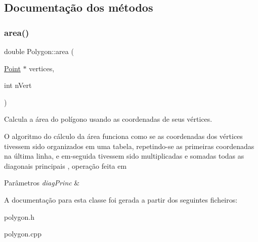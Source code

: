 \subsection{Documentação dos métodos}
\mbox{\label{class_polygon_a1605b702a19992a4631aa1011092c0c1}} 
\subsubsection{\texorpdfstring{area()}{area()}}
{\footnotesize\ttfamily double Polygon\+::area (\begin{DoxyParamCaption}\item[{\hyperlink{class_point}{Point} $\ast$}]{vertices,  }\item[{int}]{n\+Vert }\end{DoxyParamCaption})}



Calcula a área do polígono usando as coordenadas de seus vértices. 

O algoritmo do cálculo da área funciona como se as coordenadas dos vértices tivessem sido organizados em uma tabela, repetindo-\/se as primeiras coordenadas na última linha, e em-\/seguida tivessem sido multiplicadas e somadas todas as diagonais principais , operação feita em 
\begin{DoxyParams}{Parâmetros}
{\em diag\+Princ} & \\
\hline
\end{DoxyParams}


A documentação para esta classe foi gerada a partir dos seguintes ficheiros\+:\begin{DoxyCompactItemize}
\item 
polygon.\+h\item 
polygon.\+cpp\end{DoxyCompactItemize}
